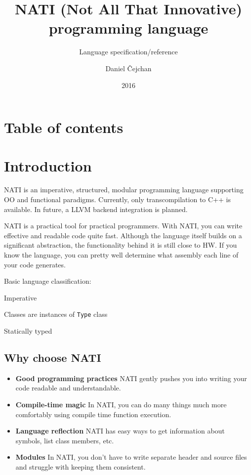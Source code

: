 





\setlength\extrarowheight{2pt}

\title{NATI (Not All That Innovative) programming language}
\subtitle{Language specification/reference}
\author{Daniel Čejchan}
\date{2016}



\mainpage

\chapter{Table of contents}
\makeatletter
{}
\makeatother

\chapter{Introduction}
NATI is an imperative, structured, modular programming language supporting OO and functional paradigms. Currently, only transcompilation to C++ is available. In future, a LLVM backend integration is planned.

NATI is a practical tool for practical programmers. With NATI, you can write effective and readable code quite fast. Although the language itself builds on a significant abstraction, the functionality behind it is still close to HW. If you know the language, you can pretty well determine what assembly each line of your code generates.

Basic language classification:
\begin{compactitem}
	\item Imperative
	\item Classes are instances of \verb|Type| class
	\item Statically typed
\end{compactitem}

\section{Why choose NATI}
\begin{itemize}
	\item \textbf{Good programming practices} NATI gently pushes you into writing your code readable and understandable.
	\item \textbf{Compile-time magic} In NATI, you can do many things much more comfortably using compile time function execution.
	\item \textbf{Language reflection} NATI has easy ways to get information about symbols, list class members, etc.
	\item \textbf{Modules} In NATI, you don't have to write separate header and source files and struggle with keeping them consistent.
\end{itemize}

